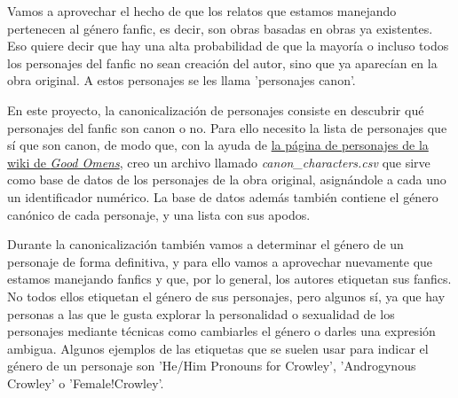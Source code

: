 \documentclass{pre-tfg}
\begin{document}
Vamos a aprovechar el hecho de que los relatos que estamos manejando pertenecen al género fanfic, es decir, son obras basadas en obras ya existentes. Eso quiere decir que hay una alta probabilidad de que la mayoría o incluso todos los personajes del fanfic no sean creación del autor, sino que ya aparecían en la obra original. A estos personajes se les llama 'personajes canon'.

En este proyecto, la canonicalización de personajes consiste en descubrir qué personajes del fanfic son canon o no. Para ello necesito la lista de personajes que sí que son canon, de modo que, con la ayuda de \href{https://goodomens.fandom.com/wiki/Category:Characters}{la página de personajes de la wiki de \textit{Good Omens}}, creo un archivo llamado \textit{canon\_characters.csv} que sirve como base de datos de los personajes de la obra original, asignándole a cada uno un identificador numérico. La base de datos además también contiene el género canónico de cada personaje, y una lista con sus apodos.

Durante la canonicalización también vamos a determinar el género de un personaje de forma definitiva, y para ello vamos a aprovechar nuevamente que estamos manejando fanfics y que, por lo general, los autores etiquetan sus fanfics. No todos ellos etiquetan el género de sus personajes, pero algunos sí, ya que hay personas a las que le gusta explorar la personalidad o sexualidad de los personajes mediante técnicas como cambiarles el género o darles una expresión ambigua. Algunos ejemplos de las etiquetas que se suelen usar para indicar el género de un personaje son 'He/Him Pronouns for Crowley', 'Androgynous Crowley' o 'Female!Crowley'.
\end{document}
